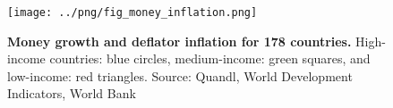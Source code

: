 \begin{figure}[h]
\caption{\label{fig:money_inflation} \textbf{Money growth and deflator inflation for 178 countries.} High-income countries: blue circles, medium-income: green squares, and low-income: red triangles. {\tiny Source: Quandl, World Development Indicators, World Bank}}
\hspace*{-.5cm}\texttt{[image: ../png/fig\_money\_inflation.png]}
\end{figure}